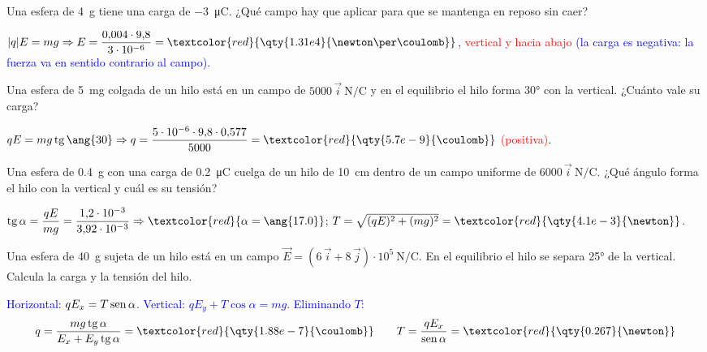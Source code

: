\begin{exercise}
    Una esfera de \qty{4}{\g} tiene una carga de \qty{-3}{\micro\coulomb}. ¿Qué campo hay que aplicar para que se mantenga en reposo sin caer?
    \begin{solu}
        \(|q|E = mg \Rightarrow E = \dfrac{0{,}004\cdot 9{,}8}{3\cdot 10^{-6}} = \textcolor{red}{\qty{1.31e4}{\newton\per\coulomb}}\),
        \textcolor{red}{vertical y hacia abajo} \textcolor{blue}{(la carga es negativa: la fuerza va en sentido contrario al campo).}
    \end{solu}
\end{exercise}

\begin{exercise}
    Una esfera de \qty{5}{\mg} colgada de un hilo está en un campo de \(5000\,\vec{i}\ \unit{\newton\per\coulomb}\) y en el equilibrio
    el hilo forma \ang{30} con la vertical. ¿Cuánto vale su carga?
    \begin{solu}
        \(qE = mg\tg\ang{30} \Rightarrow q = \dfrac{5\cdot 10^{-6}\cdot 9{,}8\cdot 0{,}577}{5000} = \textcolor{red}{\qty{5.7e-9}{\coulomb}}\) \textcolor{red}{(positiva)}.
    \end{solu}
\end{exercise}

\begin{exercise}
    Una esfera de \qty{0.4}{\g} con una carga de \qty{0.2}{\micro\coulomb} cuelga de un hilo de \qty{10}{\cm} dentro de un campo
    uniforme de \(6000\,\vec{i}\ \unit{\newton\per\coulomb}\). ¿Qué ángulo forma el hilo con la vertical y cuál es su tensión?
    \begin{solu}
        \(\tg\alpha = \dfrac{qE}{mg} = \dfrac{1{,}2\cdot 10^{-3}}{3{,}92\cdot 10^{-3}} \Rightarrow \textcolor{red}{\alpha = \ang{17.0}}\);
        \(T = \sqrt{(qE)^2 + (mg)^2} = \textcolor{red}{\qty{4.1e-3}{\newton}}\).
    \end{solu}
\end{exercise}

\begin{exercise}
    Una esfera de \qty{40}{\g} sujeta de un hilo está en un campo \(\vec E = (6\,\vec{i} + 8\,\vec{j})\cdot 10^5\ \unit{\newton\per\coulomb}\).
    En el equilibrio el hilo se separa \ang{25} de la vertical. Calcula la carga y la tensión del hilo.
    \begin{solu}
        \textcolor{blue}{Horizontal: \(qE_x = T\operatorname{sen}\alpha\). Vertical: \(qE_y + T\cos\alpha = mg\). Eliminando \(T\):}
        \[ q = \dfrac{mg\tg\alpha}{E_x + E_y\tg\alpha} = \textcolor{red}{\qty{1.88e-7}{\coulomb}} \qquad T = \dfrac{qE_x}{\sen\alpha} = \textcolor{red}{\qty{0.267}{\newton}} \]
    \end{solu}
\end{exercise}

